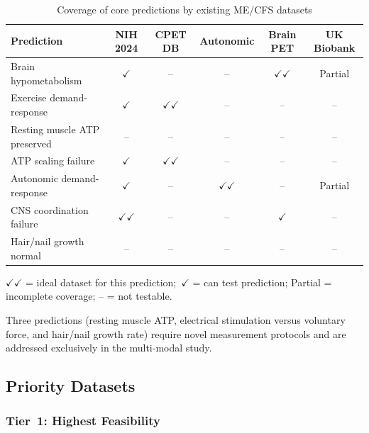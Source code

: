 \begin{table}[htbp]
  \centering
  \caption{Coverage of core predictions by existing ME/CFS datasets}
  \label{tab:prediction-dataset-mapping}
  \begin{tabular}{@{}p{4.5cm}ccccc@{}}
    \toprule
    \textbf{Prediction} & \textbf{NIH 2024} & \textbf{CPET DB} & \textbf{Autonomic} & \textbf{Brain PET} & \textbf{UK Biobank} \\
    \midrule
    Brain hypometabolism         & $\checkmark$   & --              & --              & $\checkmark\checkmark$ & Partial \\
    Exercise demand-response     & $\checkmark$   & $\checkmark\checkmark$ & --   & --                     & --      \\
    Resting muscle ATP preserved & --             & --              & --              & --                     & --      \\
    ATP scaling failure          & $\checkmark$   & $\checkmark\checkmark$ & --   & --                     & --      \\
    Autonomic demand-response    & $\checkmark$   & --              & $\checkmark\checkmark$ & --              & Partial \\
    CNS coordination failure     & $\checkmark\checkmark$ & --     & --              & $\checkmark$           & --      \\
    Hair/nail growth normal      & --             & --              & --              & --                     & --      \\
    \bottomrule
  \end{tabular}

  \smallskip
  \footnotesize $\checkmark\checkmark$ = ideal dataset for this prediction;\
  $\checkmark$ = can test prediction; Partial = incomplete coverage; -- = not testable.
\end{table}

Three predictions (resting muscle ATP, electrical stimulation versus voluntary force, and
hair/nail growth rate) require novel measurement protocols and are addressed exclusively
in the multi-modal study.

\subsection{Priority Datasets}

\subsubsection{Tier~1: Highest Feasibility}


